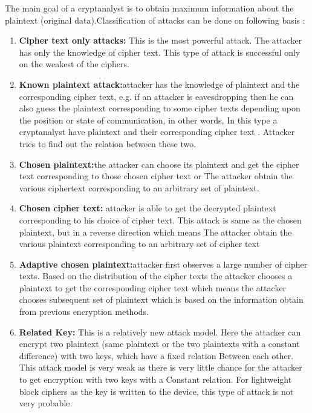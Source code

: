 The main goal of a cryptanalyst is to obtain maximum
information about the plaintext (original data).Classification
of attacks can be done on following basis \cite{stallings2006cryptography}:
\begin{enumerate}
    \item{\textbf{Cipher text only attacks:} This is the most powerful attack. The
    attacker has only the knowledge of cipher text. This type of attack is
    successful only on the weakest of the ciphers.}
    \item{\textbf{Known plaintext attack:}attacker has the knowledge of plaintext and the corresponding cipher text, e.g. if an attacker is eavesdropping then  he can also guess the plaintext corresponding to some cipher texts depending upon the position or state of communication, in other words,  In this type a cryptanalyst have plaintext and their corresponding cipher text . Attacker tries to find out the relation between these two.}
    \item{\textbf{Chosen plaintext:}the attacker can choose its plaintext and get the cipher text corresponding to those chosen cipher text or The attacker obtain the various ciphertext corresponding to an arbitrary set of plaintext. }
    \item{\textbf{Chosen cipher text:} attacker is able to get the decrypted plaintext
    corresponding to his choice of cipher text. This attack is same as the
    chosen plaintext, but in a reverse direction which means The attacker obtain the various
    plaintext corresponding to an arbitrary set of cipher text}
    \item{\textbf{Adaptive chosen plaintext:}attacker first observes a large number of cipher texts. Based on the distribution of the cipher texts the attacker chooses a plaintext to get the corresponding cipher text which means the attacker chooses
    subsequent set of plaintext which is based on the information
    obtain from previous encryption methods.}
    \item{\textbf{Related Key: } This is a relatively new attack model. Here the attacker
    can encrypt two plaintext (same plaintext or the two plaintexts with a
    constant difference) with two keys, which have a fixed relation Between each other. This attack model is very weak as there is very little
    chance for the attacker to get encryption with two keys with a Constant
    relation. For lightweight block ciphers as the key is written to the device,
    this type of attack is not very probable.}
\end{enumerate}
\newpage
